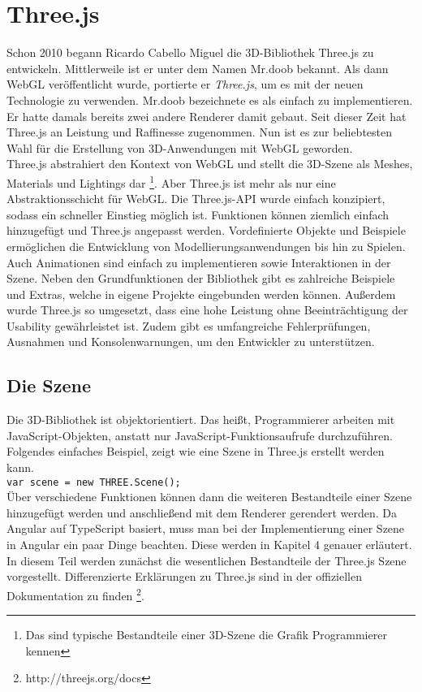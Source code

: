 \section{Three.js}
\label{sec:three.js}
%
Schon 2010 begann Ricardo Cabello Miguel die 3D-Bibliothek Three.js zu entwickeln. Mittlerweile ist er unter dem Namen Mr.doob bekannt. Als dann WebGL veröffentlicht wurde, portierte er \textit{Three.js}, um es mit der neuen Technologie zu verwenden. Mr.doob bezeichnete es als \glqq einfach zu implementieren\grqq. Er hatte damals bereits zwei andere Renderer damit gebaut. Seit dieser Zeit hat Three.js an Leistung und Raffinesse zugenommen. Nun ist es zur beliebtesten Wahl für die Erstellung von 3D-Anwendungen mit WebGL geworden. \\
Three.js abstrahiert den Kontext von WebGL und stellt die 3D-Szene als Meshes, Materials und Lightings dar \footnote{Das sind typische Bestandteile einer 3D-Szene die Grafik Programmierer kennen}. Aber Three.js ist mehr als nur eine Abstraktionsschicht für WebGL. Die Three.js-API wurde einfach konzipiert, sodass ein schneller Einstieg möglich ist. Funktionen können ziemlich einfach hinzugefügt und Three.js angepasst werden. Vordefinierte Objekte und Beispiele ermöglichen die Entwicklung von Modellierungsanwendungen bis hin zu Spielen. Auch Animationen sind einfach zu implementieren sowie Interaktionen in der Szene. Neben den Grundfunktionen der Bibliothek gibt es zahlreiche Beispiele und Extras, welche in eigene Projekte eingebunden werden können. Außerdem wurde Three.js so umgesetzt, dass eine hohe Leistung ohne Beeinträchtigung der Usability gewährleistet ist. Zudem gibt es umfangreiche Fehlerprüfungen, Ausnahmen und Konsolenwarnungen, um den Entwickler zu unterstützen.
%
\subsection{Die Szene}
\label{subsec:scene}
%
Die 3D-Bibliothek ist objektorientiert. Das heißt, Programmierer arbeiten mit JavaScript-Objekten, anstatt nur JavaScript-Funktionsaufrufe durchzuführen. Folgendes einfaches Beispiel, zeigt wie eine Szene in Three.js erstellt werden kann. \\

\texttt{var scene = new THREE.Scene();} 
\\

Über verschiedene Funktionen können dann die weiteren Bestandteile einer Szene hinzugefügt werden und anschließend mit dem Renderer gerendert werden. Da Angular auf TypeScript basiert, muss man bei der Implementierung einer Szene in Angular ein paar Dinge beachten. Diese werden in Kapitel 4 genauer erläutert. In diesem Teil werden zunächst die wesentlichen Bestandteile der Three.js Szene vorgestellt. Differenzierte Erklärungen zu Three.js sind in der offiziellen Dokumentation zu finden \footnote{http://threejs.org/docs}.
%
